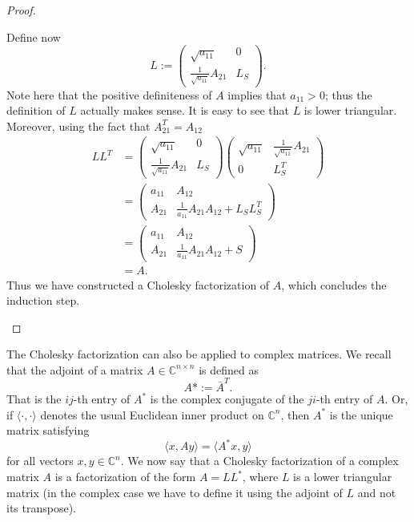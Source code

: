 \documentclass[11pt]{article}
\theoremstyle{definition}
\begin{document}
\begin{proof}
\begin{itemize}
Define now
\begin{equation*}
L:=\begin{pmatrix}
\sqrt{a_{11}} & 0 \\
\frac{1}{\sqrt{a_{11}}} A_{21} & L_S
\end{pmatrix}.
\end{equation*}
Note here that the positive definiteness of $A$ implies that $a_{11}>0$; thus
the definition of $L$ actually makes sense. It is easy to see that $L$ is lower
triangular. Moreover, using the fact that $A_{21}^T=A_{12}$
\begin{align*}
LL^T&=
\begin{pmatrix}
\sqrt{a_{11}} & 0 \\
\frac{1}{\sqrt{a_{11}}} A_{21} & L_S
\end{pmatrix}
\begin{pmatrix}
\sqrt{a_{11}} & \frac{1}{\sqrt{a_{11}}} A_{21} \\
0 & L^T_S
\end{pmatrix} \\
&=
\begin{pmatrix}
a_{11} & A_{12} \\
A_{21} & \frac{1}{a_{11}}A_{21}A_{12}+L_SL_S^T
\end{pmatrix} \\
&=
\begin{pmatrix}
a_{11} & A_{12} \\
A_{21} & \frac{1}{a_{11}}A_{21}A_{12}+S
\end{pmatrix} \\
&=A.
\end{align*}
Thus we have constructed a Cholesky factorization of $A$, which concludes the induction step.
\end{itemize}
\end{proof}
The Cholesky factorization can also be applied to complex matrices. We recall that the adjoint of a matrix $A\in\mathbb{C}^{n\times n}$ is defined as 
\begin{equation*}
A*:=\bar{A}^T.
\end{equation*}
That is the $ij$-th entry of $A^*$ is the complex conjugate of the $ji$-th entry of $A$. Or, if $\langle\cdot,\cdot\rangle$ denotes the usual Euclidean inner product on $\mathbb{C}^n$, then $A^*$ is the unique matrix satisfying 
\begin{equation*}
\langle x,Ay\rangle=\langle A^*x,y\rangle
\end{equation*}
for all vectors $x,y\in\mathbb{C}^n$. We now say that a Cholesky factorization of a complex matrix $A$ is a factorization of the form $A=LL^*$, where $L$ is a lower triangular matrix (in the complex case we have to define it using the adjoint of $L$ and not its transpose). \\\\
\end{document}
